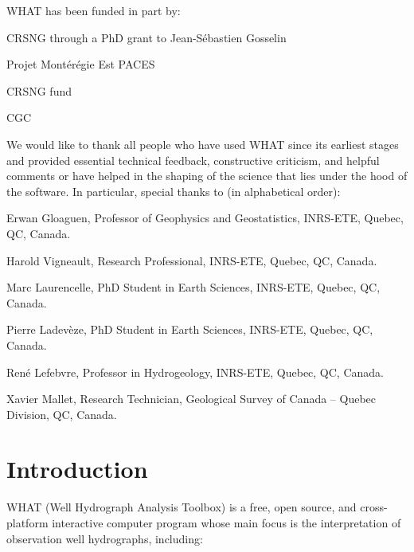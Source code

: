\documentclass[12pt, letterpaper, fleqn]{report}
\begin{document}
WHAT has been funded in part by:

\begin{description}
\item{CRSNG through a PhD grant to Jean-Sébastien Gosselin}
\item{Projet Montérégie Est PACES}
\item{CRSNG fund}
\item{CGC}
\end{description}

We would like to thank all people who have used WHAT since its earliest stages and provided essential technical feedback, constructive criticism, and helpful comments or have helped in the shaping of the science that lies under the hood of the software. In particular, special thanks to (in alphabetical order):

\begin{description}
\item{Erwan Gloaguen, Professor of Geophysics and Geostatistics, INRS-ETE, Quebec, QC, Canada.}
\item{Harold Vigneault, Research Professional, INRS-ETE, Quebec, QC, Canada.}
\item{Marc Laurencelle, PhD Student in Earth Sciences, INRS-ETE, Quebec, QC, Canada.}
\item{Pierre Ladevèze, PhD Student in Earth Sciences, INRS-ETE, Quebec, QC, Canada.}
\item{René Lefebvre, Professor in Hydrogeology, INRS-ETE, Quebec, QC, Canada.}
\item{Xavier Mallet, Research Technician, Geological Survey of Canada – Quebec Division, QC, Canada.}
\end{description}

\newpage

\chapter*{Introduction}

WHAT (Well Hydrograph Analysis Toolbox) is a free, open source, and cross-platform interactive computer program whose main focus is the interpretation of observation well hydrographs, including:
\end{document}

